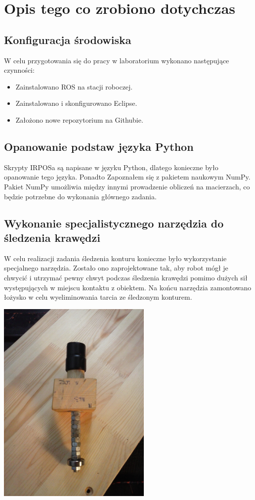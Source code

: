 \documentclass[12pt, a4paper, twoside]{book}
\begin{document}
\chapter{Opis tego co zrobiono dotychczas}
	\section{Konfiguracja środowiska}
	W celu przygotowania się do pracy w laboratorium wykonano następujące czynności:
		\begin{itemize}
			\item Zainstalowano ROS na stacji roboczej.
			\item Zainstalowano i skonfigurowano Eclipse.
			\item Założono nowe repozytorium na Githubie.
		\end{itemize}		
	\section{Opanowanie podstaw języka Python}
	Skrypty IRPOSa są napisane w języku Python, dlatego konieczne było opanowanie tego języka. Ponadto Zapoznałem się z pakietem naukowym NumPy. Pakiet NumPy umożliwia między innymi prowadzenie obliczeń na macierzach, co będzie potrzebne do wykonania głównego zadania.
	\section{Wykonanie specjalistycznego narzędzia do śledzenia krawędzi}
	W celu realizacji zadania śledzenia konturu konieczne było wykorzystanie specjalnego narzędzia. Zostało ono zaprojektowane tak, aby robot mógł je chwycić i utrzymać pewny chwyt podczas śledzenia krawędzi pomimo dużych sił występujących w miejscu kontaktu z obiektem. Na końcu narzędzia zamontowano łożysko w celu wyeliminowania tarcia ze śledzonym konturem.
	
	\includegraphics[width=7.5cm,height=10cm]{images/MK3.jpg}
	
\end{document}
